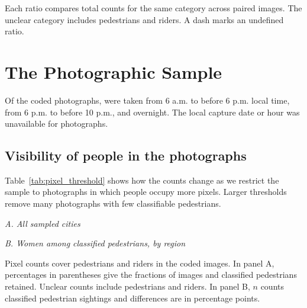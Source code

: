 \documentclass[11pt]{article}
\begin{document}
\begin{table}[ht]
\centering
\caption{Human and Muse counts on the same \CalImages{} images.}
\label{tab:calibration}
\begin{threeparttable}
\footnotesize

\begin{tablenotes}[flushleft]\footnotesize
\item Each ratio compares total counts for the same category across paired images. The unclear category includes pedestrians and riders. A dash marks an undefined ratio.
\end{tablenotes}
\end{threeparttable}
\end{table}

\clearpage



\clearpage
\appendix
\section{The Photographic Sample}
\label{sec:photo_context}
Of the \TotalImages{} coded photographs, \DaytimePhotos{} were taken from 6 a.m. to before 6 p.m. local time, \EveningPhotos{} from 6 p.m. to before 10 p.m., and \OvernightPhotos{} overnight. The local capture date or hour was unavailable for \NoTimePhotos{} photographs.

\subsection{Visibility of people in the photographs}
Table~\ref{tab:pixel_threshold} shows how the counts change as we restrict the sample to photographs in which people occupy more pixels. Larger thresholds remove many photographs with few classifiable pedestrians.
\begin{table}[ht]
\centering
\caption{Counts and pedestrian shares by minimum image area occupied by people.}
\label{tab:pixel_threshold}
\begin{threeparttable}
\footnotesize
\textit{A. All sampled cities}\par
\par\medskip
\textit{B. Women among classified pedestrians, by region}\par

\begin{tablenotes}[flushleft]\footnotesize
\item Pixel counts cover pedestrians and riders in the \TotalImages{} coded images. In panel A, percentages in parentheses give the fractions of images and classified pedestrians retained. Unclear counts include pedestrians and riders. In panel B, $n$ counts classified pedestrian sightings and differences are in percentage points.
\end{tablenotes}
\end{threeparttable}
\end{table}
\end{document}
